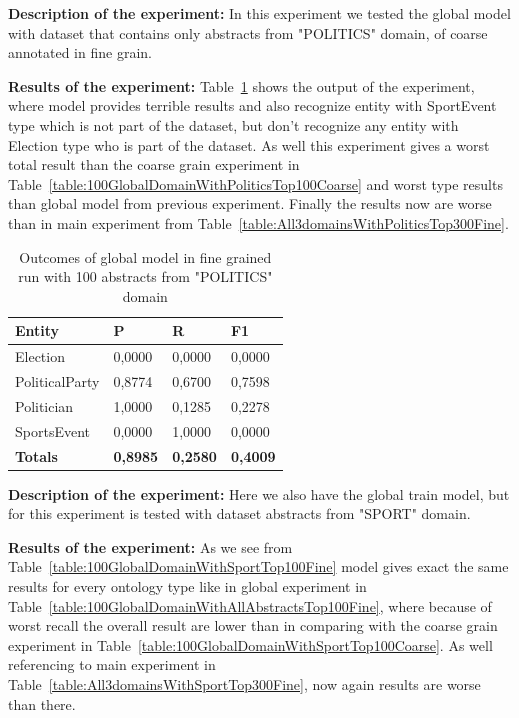 \documentclass[thesis=M,english]{FITthesis}[2018/05/30]
\begin{document}
	\textbf{Description of the experiment:} In this experiment we tested the global model with dataset that contains only abstracts from "POLITICS" domain, of coarse annotated in fine grain.  

	\textbf{Results of the experiment:} Table~\ref{table:100GlobalDomainWithPoliticsTop100Fine} shows the output of the experiment, where model provides terrible results and also recognize entity with SportEvent type which is not part of the dataset, but don't recognize any entity with Election type who is part of the dataset. As well this experiment gives a worst total result than the coarse grain experiment in Table~\ref{table:100GlobalDomainWithPoliticsTop100Coarse} and worst type results than global model from previous experiment. Finally the results now are worse than in main experiment from Table~\ref{table:All3domainsWithPoliticsTop300Fine}.

	\begin{table}[H]\centering
		\begin{tabular}{|l|l|l|l|}
			\hline {\textbf{Entity}} & {\textbf{P}} & {\textbf{R}} & {\textbf{F1}}\\\hline
				Election & 0,0000 & 0,0000 & 0,0000\\
				PoliticalParty & 0,8774 & 0,6700 & 0,7598\\
				Politician & 1,0000 & 0,1285 & 0,2278\\
				SportsEvent & 0,0000 & 1,0000 & 0,0000\\\hline
				\textbf{Totals} & \textbf{0,8985} & \textbf{0,2580} & \textbf{0,4009}\\\hline
		\end{tabular}
		\caption{Outcomes of global model in fine grained run with 100 abstracts from "POLITICS" domain \label{table:100GlobalDomainWithPoliticsTop100Fine}}
	\end{table}	


	\textbf{Description of the experiment:} Here we also have the global train model, but for this experiment is tested with dataset abstracts from "SPORT" domain.

	\textbf{Results of the experiment:} As we see from Table~\ref{table:100GlobalDomainWithSportTop100Fine} model gives exact the same results for every ontology type like in global experiment in Table~\ref{table:100GlobalDomainWithAllAbstractsTop100Fine}, where because of worst recall the overall result are lower than in comparing with the coarse grain experiment in Table~\ref{table:100GlobalDomainWithSportTop100Coarse}. As well referencing to main experiment in Table~\ref{table:All3domainsWithSportTop300Fine}, now again results are worse than there.  
\end{document}
